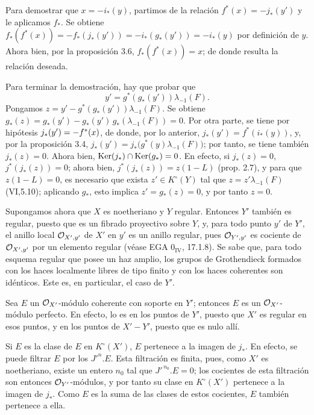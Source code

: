 Para demostrar que \(x=-i_*(y)\), partimos de la relación \(f^*(x)=-j_*(y')\) y le aplicamos \(f_*\). Se obtiene \(f_*(f^*(x))=-f_*(j_*(y'))=-i_*(g_*(y'))=-i_*(y)\) por definición de \(y\). Ahora bien, por la proposición 3.6, \(f_*(f^*(x))=x\); de donde resulta la relación deseada.

Para terminar la demostración, hay que probar que
\[
y'=g^*(g_*(y'))\lambda_{-1}(F).
\]
Pongamos \(z=y'-g^*(g_*(y'))\lambda_{-1}(F)\). Se obtiene \(g_*(z)=g_*(y')-g_*(y')\,g_*(\lambda_{-1}(F))=0\). Por otra parte, se tiene por hipótesis \(\sisi{j_*(y')=f^*(x)}{j_*(y')=-f^*(x)}\), de donde, por lo anterior, \(j_*(y')=f^*(i_*(y))\), y, por la proposición 3.4, \(j_*(y')=j_*\bigl(g^*(y)\lambda_{-1}(F)\bigr)\); por tanto, se tiene también \(j_*(z)=0\). Ahora bien, \(\Ker(j_*)\cap\Ker(g_*)=0\). En efecto, si \(j_*(z)=0\), \(j^*(j_*(z))=0\); ahora bien, \(j^*(j_*(z))=z(1-L)\) (prop. 2.7), y para que \(z(1-L)=0\), es necesario que exista \(z'\in K^\circ(Y)\) tal que \(z=z'\lambda_{-1}(F)\) (VI,5.10); aplicando \(g_*\), esto implica \(z'=g_*(z)=0\), y por tanto \(z=0\).

Supongamos ahora que \(X\) es noetheriano y \(Y\) regular. Entonces \(Y'\) también es regular, puesto que es un fibrado proyectivo sobre \(Y\), y, para todo punto \(y'\) de \(Y'\), el anillo local \(\cO_{X',y'}\) de \(X'\) en \(y'\) es un anillo regular, pues \(\cO_{Y',y'}\) es cociente de \(\cO_{X',y'}\) por un elemento regular (véase EGA \(0_{\mathrm{IV}}\), 17.1.8). Se sabe que, para todo esquema regular que posee un haz amplio, los grupos de Grothendieck formados con los haces localmente libres de tipo finito y con los haces coherentes son idénticos. Este es, en particular, el caso de \(Y'\).

Sea \(E\) un \(\cO_{X'}\)-módulo coherente con soporte en \(Y'\); entonces \(E\) es un \(\cO_{X'}\)-módulo perfecto. En efecto, lo es en los puntos de \(Y'\), puesto que \(X'\) es regular en esos puntos, y en los puntos de \(X'-Y'\), puesto que es nulo allí.

Si \(E\) es la clase de \(E\) en \(K^\circ(X')\), \(E\) pertenece a la imagen de \(j_*\). En efecto, se puede filtrar \(E\) por los \(J'^n.E\). Esta filtración es finita, pues, como \(X'\) es noetheriano, existe un entero \(n_0\) tal que \(J'^{\,n_0}.E=0\); los cocientes de esta filtración son entonces \(\cO_{Y'}\)-módulos, y por tanto su clase en \(K^\circ(X')\) pertenece a la imagen de \(j_*\). Como \(E\) es la suma de las clases de estos cocientes, \(E\) también pertenece a ella.

